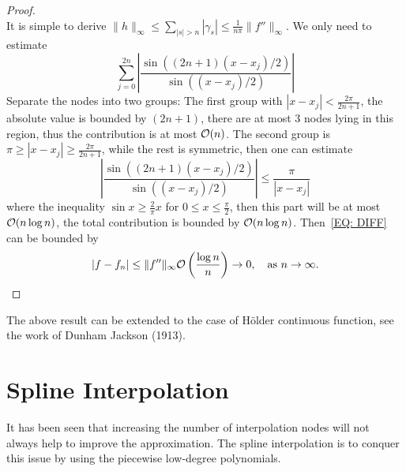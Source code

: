 \begin{proof}
\begin{equation}
    \end{equation}
    It is simple to derive $\|h\|_{\infty} \le \sum_{|s|>n}|\gamma_s| \le \frac{1}{n\pi}\|f''\|_{\infty}$. We only need to estimate 
    $$ \sum_{j=0}^{2n} \left|\frac{\sin((2n+1)(x-x_j)/2)}{\sin((x-x_j)/2)}\right|$$
    Separate the nodes into two groups: The first group with $|x - x_j| < \frac{2\pi}{2n+1}$, the absolute value is bounded by $(2n+1)$, there are at most $3$ nodes lying in this region, thus the contribution is at most $\mathcal O(n)$. The second group is $\pi\ge |x - x_j| \ge \frac{2\pi}{2n+1}$, while the rest is symmetric, then one can estimate 
    \begin{equation}
        \left|\frac{\sin((2n+1)(x-x_j)/2)}{\sin((x-x_j)/2)}\right| \le \frac{\pi}{|x - x_j|}
    \end{equation}
where the inequality $\sin x \ge \frac{2}{\pi}x$ for $0\le x\le \frac{\pi}{2}$, then this part will be at most $\mathcal O(n\log n)$, the total contribution is bounded by $\mathcal O(n\log n)$. Then~\eqref{EQ: DIFF} can be bounded by 
\begin{equation}
    |f - f_n|\le \|f''\|_{\infty} \mathcal O\left(\frac{\log n}{n}\right)\to 0,\quad \text{as } n\to \infty.
\end{equation}
\end{proof}
The above result can be extended to the case of H\"older continuous function, see the work of Dunham Jackson (1913).



\section{Spline Interpolation}
It has been seen that increasing the number of interpolation nodes will not always help to improve the approximation. The spline interpolation is to conquer this issue by using the piecewise low-degree polynomials. 

